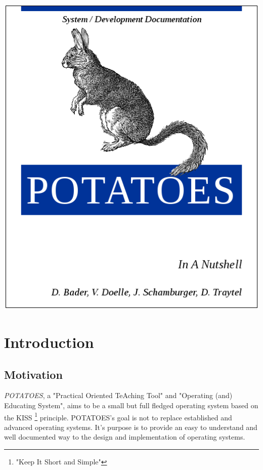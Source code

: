 \documentclass[11pt,a4paper]{scrartcl}
\begin{document}
\begin{titlepage}
\includegraphics[viewport = 90 575 0 0, scale = 1.2]{inanutshell.png}
\end{titlepage}

\tableofcontents
\pagebreak

\section{Introduction}

\subsection{Motivation}
\textit{POTATOES}, a "Practical Oriented TeAching Tool" and "Operating (and) Educating System", aims to be a small but full fledged operating system based on the KISS \footnote{"Keep It Short and Simple"} principle. POTATOES's goal is not to replace established and advanced operating systems. It's purpose is to provide an easy to understand and well documented way to the design and implementation of operating systems.\\
\end{document}
